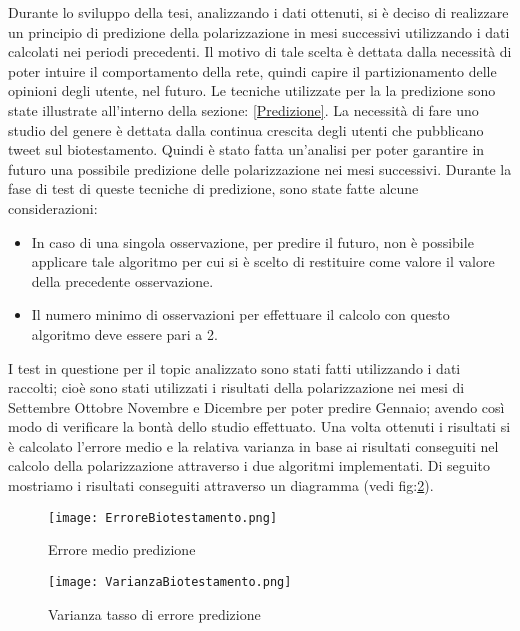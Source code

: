 Durante lo sviluppo della tesi, analizzando i dati ottenuti, si è deciso di realizzare un principio di predizione della polarizzazione in mesi successivi utilizzando i dati calcolati nei periodi precedenti. Il motivo di tale scelta è dettata dalla necessità di poter intuire il comportamento della rete, quindi capire il partizionamento delle opinioni degli utente, nel futuro. Le tecniche utilizzate per la la predizione sono state illustrate all'interno della sezione: \ref{Predizione}.
La necessità di fare uno studio del genere è dettata dalla continua crescita degli utenti che pubblicano tweet sul biotestamento. Quindi è stato fatta un'analisi per poter garantire in futuro una possibile predizione delle polarizzazione nei mesi successivi.
Durante la fase di test di queste tecniche di predizione, sono state fatte alcune considerazioni:
\begin{itemize}
\item In caso di una singola osservazione, per predire il futuro, non è possibile applicare tale algoritmo per cui si è scelto di restituire come valore il valore della precedente  osservazione.
\item Il numero minimo di osservazioni per effettuare il calcolo con questo algoritmo deve essere pari a 2.
\end{itemize}
I test in questione per il topic analizzato sono stati fatti utilizzando i dati raccolti; cioè sono stati utilizzati i risultati della polarizzazione nei mesi di Settembre Ottobre Novembre e Dicembre per poter predire Gennaio; avendo così modo di verificare la bontà dello studio effettuato.
Una volta ottenuti i risultati si è calcolato l'errore medio e la relativa varianza in base ai risultati conseguiti nel calcolo della polarizzazione attraverso i due algoritmi implementati. Di seguito mostriamo i risultati conseguiti attraverso un diagramma (vedi fig:\ref{predizioneBiotestamento}).

\begin{figure}[!ht]
\centering
\texttt{[image: ErroreBiotestamento.png]}
\caption{Errore medio predizione}
\label{predizioneSicilia1}
\end{figure}
\begin{figure}[!ht]
\centering
\texttt{[image: VarianzaBiotestamento.png]}
\caption{Varianza tasso di errore predizione}
\label{predizioneBiotestamento}
\end{figure}